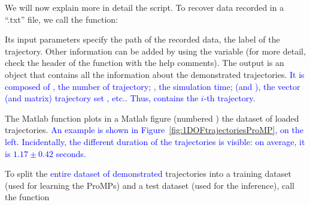 \documentclass[utf8]{frontiersSCNS} %
\newcommand{\rev}[1]{\textcolor{blue}{#1}}
\begin{document}
We will now explain more in detail the script. 
To recover data recorded in a ``.txt'' file, we call the function:


Its input parameters specify the path of the recorded data, the label of the trajectory. Other information can be added by using the  variable (for more detail, check the header of the function with the help comments). 
The output is an object that contains all the information about the demonstrated trajectories. \rev{It is composed of , the number of trajectory; \mcode{realTime}, the simulation time; \mcode{y} (and \mcode{yMat}), the vector (and matrix) trajectory set , etc.}. 
\rev{Thus,  contains the $i$-th trajectory}.


The Matlab function  plots in a Matlab figure (numbered ) the dataset of loaded trajectories. %
\rev{An example is shown in Figure~\ref{fig:1DOFtrajectoriesProMP}, on the left. Incidentally, the different duration of the trajectories is visible: on average, it is $1.17 \pm 0.42$ seconds.}



To split the \rev{entire dataset of demonstrated} trajectories  
into a training dataset (used for learning the ProMPs) and a test dataset (used for the inference), call the function
\end{document}
